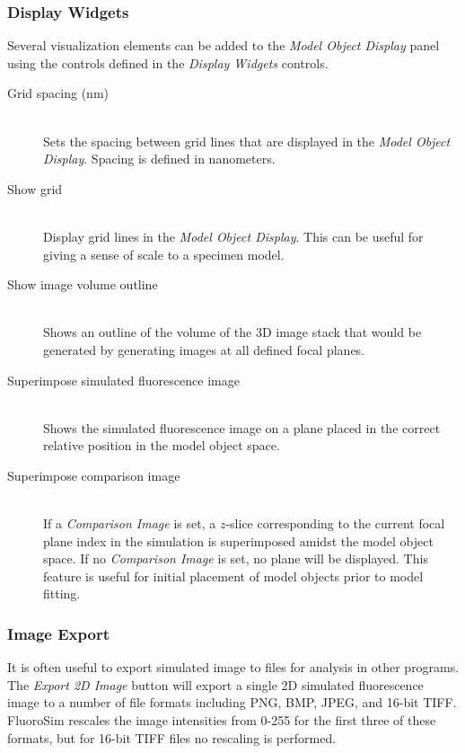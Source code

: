 \documentclass[11pt,titlepage,twoside]{article}
\begin{document}
\subsubsection{Display Widgets}

Several visualization elements can be added to the \emph{Model Object Display} panel using the controls defined in the \emph{Display Widgets} controls.

\begin{description}

\item[Grid spacing (nm)] \hfill \\
Sets the spacing between grid lines that are displayed in the \emph{Model Object Display}. Spacing is defined in nanometers.

\item[Show grid] \hfill \\
Display grid lines in the \emph{Model Object Display}. This can be useful for giving a sense of scale to a specimen model.

\item[Show image volume outline] \hfill \\
Shows an outline of the volume of the 3D image stack that would be generated by generating images at all defined focal planes.

\item[Superimpose simulated fluorescence image] \hfill \\
Shows the simulated fluorescence image on a plane placed in the correct relative position in the model object space.

\item[Superimpose comparison image] \hfill \\
If a \emph{Comparison Image} is set, a $z$-slice corresponding to the current focal plane index in the simulation is superimposed amidst the model object space. If no \emph{Comparison Image} is set, no plane will be displayed. This feature is useful for initial placement of model objects prior to model fitting.

\end{description}

\subsubsection{Image Export}

It is often useful to export simulated image to files for analysis in other programs. The \emph{Export 2D Image} button will export a single 2D simulated fluorescence image to a number of file formats including PNG, BMP, JPEG, and 16-bit TIFF. FluoroSim rescales the image intensities from 0-255 for the first three of these formats, but for 16-bit TIFF files no rescaling is performed.
\end{document}
